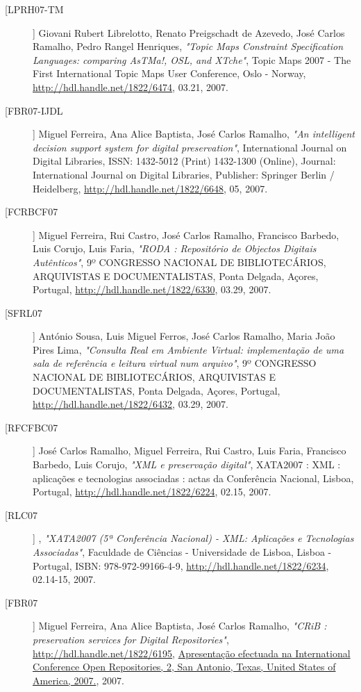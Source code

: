 \begin{description}
\item[[LPRH07-TM]]
    \textsf{Giovani Rubert Librelotto, Renato Preigschadt de Azevedo, José Carlos Ramalho, Pedro Rangel Henriques}, \emph{"Topic Maps Constraint Specification Languages: comparing AsTMa!, OSL, and XTche"}, Topic Maps 2007 -  The First International Topic Maps User Conference, Oslo - Norway, \url{http://hdl.handle.net/1822/6474}, 03.21, 2007.

\item[[FBR07-IJDL]]
    \textsf{Miguel Ferreira, Ana Alice Baptista, José Carlos Ramalho}, \emph{"An intelligent decision support system for digital preservation"}, International Journal on Digital Libraries, ISSN: 1432-5012 (Print) 1432-1300 (Online), Journal: International Journal on Digital Libraries, Publisher: Springer Berlin / Heidelberg, \url{http://hdl.handle.net/1822/6648}, 05, 2007.

\item[[FCRBCF07]]
    \textsf{Miguel Ferreira, Rui Castro, José Carlos Ramalho, Francisco Barbedo, Luis Corujo, Luis Faria}, \emph{"RODA : Repositório de Objectos Digitais Autênticos"}, 9º CONGRESSO NACIONAL DE BIBLIOTECÁRIOS, ARQUIVISTAS E DOCUMENTALISTAS, Ponta Delgada, Açores, Portugal, \url{http://hdl.handle.net/1822/6330}, 03.29, 2007.

\item[[SFRL07]]
    \textsf{António Sousa, Luis Miguel Ferros, José Carlos Ramalho, Maria João Pires Lima}, \emph{"Consulta Real em Ambiente Virtual: implementação de uma sala de referência e leitura virtual num arquivo"}, 9º CONGRESSO NACIONAL DE BIBLIOTECÁRIOS, ARQUIVISTAS E DOCUMENTALISTAS, Ponta Delgada, Açores, Portugal, \url{http://hdl.handle.net/1822/6432}, 03.29, 2007.

\item[[RFCFBC07]]
    \textsf{José Carlos Ramalho, Miguel Ferreira, Rui Castro, Luis Faria, Francisco Barbedo, Luis Corujo}, \emph{"XML e preservação digital"}, XATA2007 : XML : aplicações e tecnologias associadas : actas da Conferência Nacional, Lisboa, Portugal, \url{http://hdl.handle.net/1822/6224}, 02.15, 2007.

\item[[RLC07]]
    \textsf{}, \emph{"XATA2007 (5ª Conferência Nacional) - XML: Aplicações e Tecnologias Associadas"}, Faculdade de Ciências - Universidade de Lisboa, Lisboa - Portugal, ISBN: 978-972-99166-4-9, \url{http://hdl.handle.net/1822/6234}, 02.14-15, 2007.

\item[[FBR07]]
    \textsf{Miguel Ferreira, Ana Alice Baptista, José Carlos Ramalho}, \emph{"CRiB : preservation services for Digital Repositories"}, \url{http://hdl.handle.net/1822/6195}, \url{Apresentação efectuada na International Conference Open Repositories, 2, San Antonio, Texas, United States of America, 2007.}, 2007.


\end{description}
